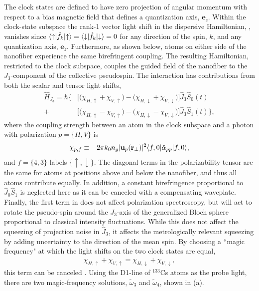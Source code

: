 \documentclass[aps,pra,twocolumn]{revtex4-1} %
\newcommand{\jz}{\hat{J}_3}
\newcommand{\magic}[1]{\tilde{\omega}_{#1}}
\begin{document}
The clock states are defined to have zero projection of angular momentum with respect to a bias magnetic field that defines a quantization axis, $\mathbf{e}_{\tilde{z}}$.  
Within the clock-state subspace the rank-1 vector light shift in the dispersive Hamiltonian, , vanishes since $\langle{\uparrow}\rvert\hat{f}_k \lvert{\uparrow}\rangle =\langle{\downarrow}\rvert\hat{f}_k \lvert{\downarrow}\rangle = 0$ for any direction of the spin, $k$, and any quantization axis, $\mathbf{e}_{\tilde{z}}$. 
Furthermore, as shown below, atoms on either side of the nanofiber experience the same birefringent coupling. 
The resulting Hamiltonian, restricted to the clock subspace, couples the guided field of the nanofiber to the $J_3$-component of the collective pseudospin. The interaction has contributions from both the scalar and tensor light shifts,
	\begin{align} \label{Eq::ClockHamiltonian}
		\hat{H}_{J_3} = \hbar \Big\{ & \big[ \big( \chi_{H,\uparrow} +\chi_{V,\uparrow} \big) - \big( \chi_{H,\downarrow} + \chi_{V,\downarrow}\big) \big] \jz \hat{S}_0(t) \\
		+ & \big[  \big( \chi_{H, \uparrow} - \chi_{V,\uparrow} \big) - \big(\chi_{H,\downarrow} - \chi_{V,\downarrow} \big) \big]  \jz \hat{S}_1(t) \Big\}, \nonumber
	\end{align}
where the coupling strength between an atom in the clock subspace and a photon with polarization $p = \{H,V\}$ is
	\begin{equation} \label{Eq::ClockCouplingStrength}
		\chi_{p,f} \equiv - 2\pi k_0 n_g  | \mathbf{u}_p(\mathbf{r}_\perp)|^2 \langle{f,0}\rvert\hat{\alpha}_{pp}  \lvert{f,0}\rangle,
	\end{equation}
and $f = \{4,3\}$ labels $\{\uparrow,\downarrow\}$.  
The diagonal terms in the polarizability tensor are the same for atoms at positions above and below the nanofiber, and thus all atoms contribute equally. 
In addition, a constant birefringence proportional to $ \hat{J}_0\hat{S}_1 $ is neglected here as it can be canceled with a compensating waveplate. 
Finally, the first term in  does not affect polarization spectroscopy, but will act to rotate the pseudo-spin around the $J_3$-axis of the generalized Bloch sphere proportional to classical intensity fluctuations.
While this does not affect the squeezing of projection noise in $\hat{J}_3$, it affects the metrologically relevant squeezing by adding uncertainty to the direction of the mean spin.  By choosing a ``magic frequency" at which the light shifts on the two clock states are equal, 
	\begin{align} \label{Eq::MagicWavelengthCondition}
		\chi_{H,\uparrow} +\chi_{V,\uparrow}  = \chi_{H,\downarrow} + \chi_{V,\downarrow},
	\end{align}
this term can be canceled \cite{chaudhury_continuous_2006}.
Using the D1-line of $^{133}$Cs atoms as the probe light, there are two magic-frequency solutions, $ \magic{3} $ and $\magic{4}$, shown in (a).  
\end{document}

